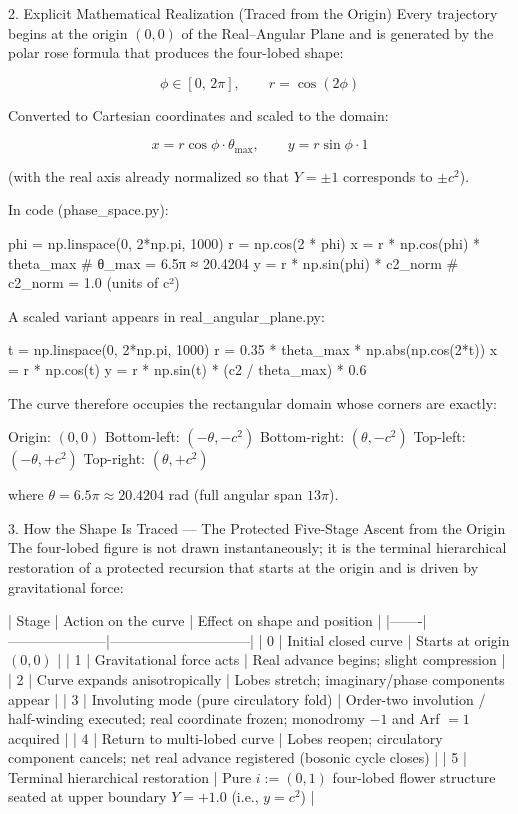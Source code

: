 2. Explicit Mathematical Realization (Traced from the Origin)
Every trajectory begins at the origin \((0,0)\) of the Real–Angular Plane and is generated by the polar rose formula that produces the four-lobed shape:

\[
\phi \in [0,\,2\pi],\qquad
r = \cos(2\phi)
\]

Converted to Cartesian coordinates and scaled to the domain:

\[
x = r\cos\phi\cdot\theta_{\max},\qquad
y = r\sin\phi\cdot 1
\]

(with the real axis already normalized so that \(Y=\pm 1\) corresponds to \(\pm c^2\)).

In code (phase_space.py):

phi = np.linspace(0, 2*np.pi, 1000)
r = np.cos(2 * phi)
x = r * np.cos(phi) * theta_max   # θ_max = 6.5π ≈ 20.4204
y = r * np.sin(phi) * c2_norm     # c2_norm = 1.0 (units of c²)

A scaled variant appears in real_angular_plane.py:

t = np.linspace(0, 2*np.pi, 1000)
r = 0.35 * theta_max * np.abs(np.cos(2*t))
x = r * np.cos(t)
y = r * np.sin(t) * (c2 / theta_max) * 0.6

The curve therefore occupies the rectangular domain whose corners are exactly:

Origin: \((0,0)\)
Bottom-left: \((-\theta,-c^2)\)
Bottom-right: \((\theta,-c^2)\)
Top-left: \((-\theta,+c^2)\)
Top-right: \((\theta,+c^2)\)

where \(\theta=6.5\pi\approx20.4204\) rad (full angular span \(13\pi\)).

3. How the Shape Is Traced — The Protected Five-Stage Ascent from the Origin
The four-lobed figure is not drawn instantaneously; it is the terminal hierarchical restoration of a protected recursion that starts at the origin and is driven by gravitational force:

| Stage | Action on the curve | Effect on shape and position |
|-------|---------------------|------------------------------|
| 0 | Initial closed curve | Starts at origin \((0,0)\) |
| 1 | Gravitational force acts | Real advance begins; slight compression |
| 2 | Curve expands anisotropically | Lobes stretch; imaginary/phase components appear |
| 3 | Involuting mode (pure circulatory fold) | Order-two involution / half-winding executed; real coordinate frozen; monodromy \(-1\) and Arf \(=1\) acquired |
| 4 | Return to multi-lobed curve | Lobes reopen; circulatory component cancels; net real advance registered (bosonic cycle closes) |
| 5 | Terminal hierarchical restoration | Pure \(i:=(0,1)\) four-lobed flower structure seated at upper boundary \(Y=+1.0\) (i.e., \(y=c^2\)) |

